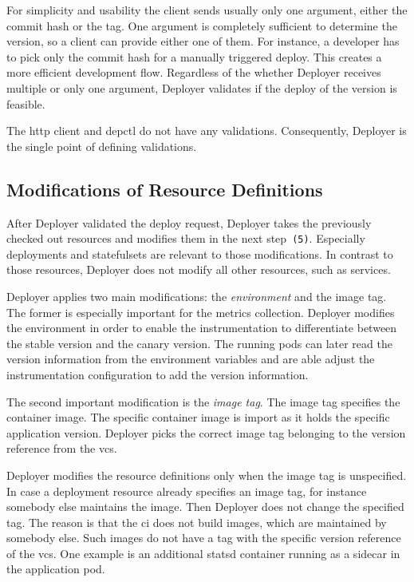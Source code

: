 For simplicity and usability the client sends usually only one argument, either the commit
hash or the tag. One argument is completely sufficient to determine the version, so a
client can provide either one of them. For instance, a developer has to pick only the
commit hash for a manually triggered deploy. This creates a more efficient development
flow. Regardless of the whether Deployer receives multiple or only one argument, Deployer
validates if the deploy of the version is feasible.

The http client and depctl do not have any validations. Consequently, Deployer is the
single point of defining validations.

\subsection{Modifications of Resource Definitions}

After Deployer validated the deploy request, Deployer takes the previously checked out
resources and modifies them in the next step~\texttt{(5)}. Especially deployments and
statefulsets are relevant to those modifications. In contrast to those resources, Deployer
does not modify all other resources, such as services.

Deployer applies two main modifications: the \emph{environment} and the image tag. The
former is especially important for the metrics collection. Deployer modifies the
environment in order to enable the instrumentation to differentiate between the stable
version and the canary version. The running pods can later read the version information
from the environment variables and are able adjust the instrumentation configuration to
add the version information.

The second important modification is the \emph{image tag}. The image tag specifies the
container image. The specific container image is import as it holds the specific
application version. Deployer picks the correct image tag belonging to the version
reference from the \gls{vcs}.

Deployer modifies the resource definitions only when the image tag is unspecified. In case
a deployment resource already specifies an image tag, for instance somebody else maintains
the image. Then Deployer does not change the specified tag. The reason is that the
\gls{ci} does not build images, which are maintained by somebody else. Such images do not
have a tag with the specific version reference of the \gls{vcs}. One example is an
additional statsd container running as a sidecar in the application pod.


